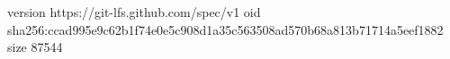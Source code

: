 version https://git-lfs.github.com/spec/v1
oid sha256:ccad995e9c62b1f74e0e5c908d1a35c563508ad570b68a813b71714a5eef1882
size 87544
